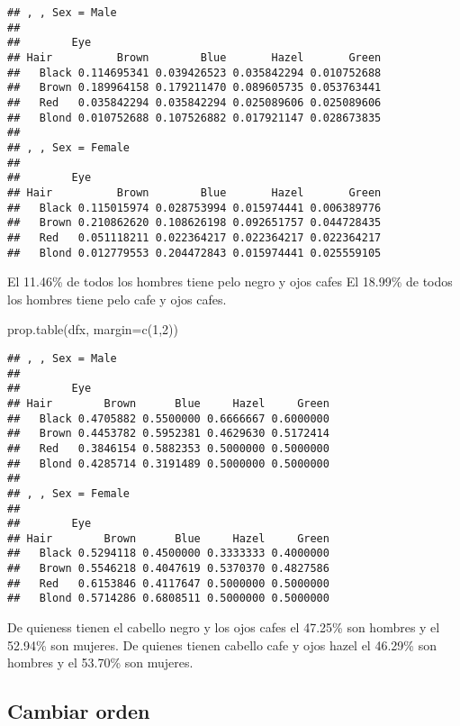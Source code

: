 \documentclass[
]{article}
\newenvironment{Shaded}{\begin{snugshade}}{\end{snugshade}}
\newcommand{\AttributeTok}[1]{\textcolor[rgb]{0.77,0.63,0.00}{#1}}
\newcommand{\DecValTok}[1]{\textcolor[rgb]{0.00,0.00,0.81}{#1}}
\newcommand{\FunctionTok}[1]{\textcolor[rgb]{0.00,0.00,0.00}{#1}}
\newcommand{\NormalTok}[1]{#1}
\begin{document}
\begin{verbatim}
## , , Sex = Male
## 
##        Eye
## Hair          Brown        Blue       Hazel       Green
##   Black 0.114695341 0.039426523 0.035842294 0.010752688
##   Brown 0.189964158 0.179211470 0.089605735 0.053763441
##   Red   0.035842294 0.035842294 0.025089606 0.025089606
##   Blond 0.010752688 0.107526882 0.017921147 0.028673835
## 
## , , Sex = Female
## 
##        Eye
## Hair          Brown        Blue       Hazel       Green
##   Black 0.115015974 0.028753994 0.015974441 0.006389776
##   Brown 0.210862620 0.108626198 0.092651757 0.044728435
##   Red   0.051118211 0.022364217 0.022364217 0.022364217
##   Blond 0.012779553 0.204472843 0.015974441 0.025559105
\end{verbatim}

El 11.46\% de todos los hombres tiene pelo negro y ojos cafes El 18.99\%
de todos los hombres tiene pelo cafe y ojos cafes.

\begin{Shaded}
\begin{Highlighting}[]
\FunctionTok{prop.table}\NormalTok{(dfx, }\AttributeTok{margin=}\FunctionTok{c}\NormalTok{(}\DecValTok{1}\NormalTok{,}\DecValTok{2}\NormalTok{))}
\end{Highlighting}
\end{Shaded}

\begin{verbatim}
## , , Sex = Male
## 
##        Eye
## Hair        Brown      Blue     Hazel     Green
##   Black 0.4705882 0.5500000 0.6666667 0.6000000
##   Brown 0.4453782 0.5952381 0.4629630 0.5172414
##   Red   0.3846154 0.5882353 0.5000000 0.5000000
##   Blond 0.4285714 0.3191489 0.5000000 0.5000000
## 
## , , Sex = Female
## 
##        Eye
## Hair        Brown      Blue     Hazel     Green
##   Black 0.5294118 0.4500000 0.3333333 0.4000000
##   Brown 0.5546218 0.4047619 0.5370370 0.4827586
##   Red   0.6153846 0.4117647 0.5000000 0.5000000
##   Blond 0.5714286 0.6808511 0.5000000 0.5000000
\end{verbatim}

De quieness tienen el cabello negro y los ojos cafes el 47.25\% son
hombres y el 52.94\% son mujeres. De quienes tienen cabello cafe y ojos
hazel el 46.29\% son hombres y el 53.70\% son mujeres.

\hypertarget{cambiar-orden}{%
\subsection{Cambiar orden}\label{cambiar-orden}}
\end{document}
